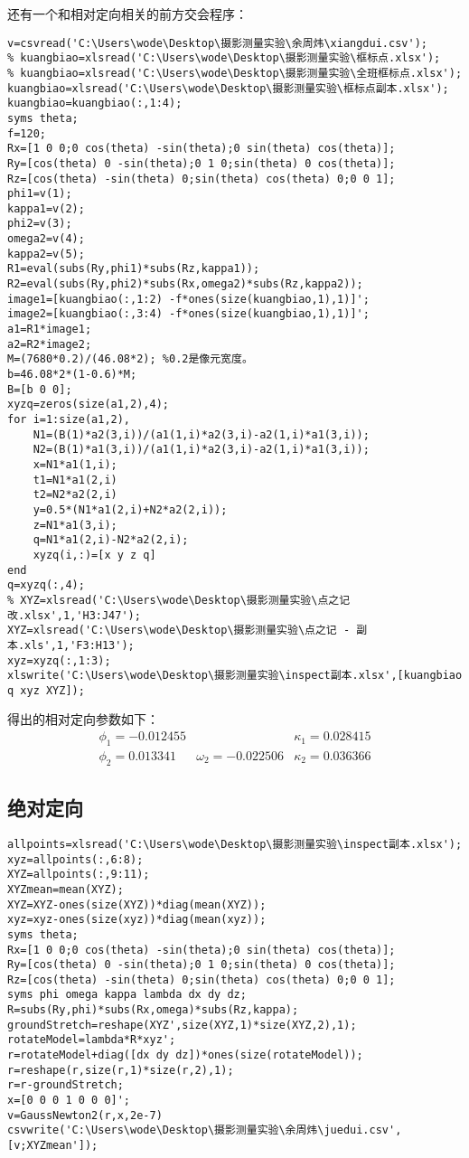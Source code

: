 还有一个和相对定向相关的前方交会程序：
\begin{lstlisting}[caption=qianfang.m]
v=csvread('C:\Users\wode\Desktop\摄影测量实验\余周炜\xiangdui.csv');
% kuangbiao=xlsread('C:\Users\wode\Desktop\摄影测量实验\框标点.xlsx');
% kuangbiao=xlsread('C:\Users\wode\Desktop\摄影测量实验\全班框标点.xlsx');
kuangbiao=xlsread('C:\Users\wode\Desktop\摄影测量实验\框标点副本.xlsx');
kuangbiao=kuangbiao(:,1:4);
syms theta;
f=120;
Rx=[1 0 0;0 cos(theta) -sin(theta);0 sin(theta) cos(theta)];
Ry=[cos(theta) 0 -sin(theta);0 1 0;sin(theta) 0 cos(theta)];
Rz=[cos(theta) -sin(theta) 0;sin(theta) cos(theta) 0;0 0 1];
phi1=v(1);
kappa1=v(2);
phi2=v(3);
omega2=v(4);
kappa2=v(5);
R1=eval(subs(Ry,phi1)*subs(Rz,kappa1));
R2=eval(subs(Ry,phi2)*subs(Rx,omega2)*subs(Rz,kappa2));
image1=[kuangbiao(:,1:2) -f*ones(size(kuangbiao,1),1)]';
image2=[kuangbiao(:,3:4) -f*ones(size(kuangbiao,1),1)]';
a1=R1*image1;
a2=R2*image2;
M=(7680*0.2)/(46.08*2); %0.2是像元宽度。
b=46.08*2*(1-0.6)*M;
B=[b 0 0];
xyzq=zeros(size(a1,2),4);
for i=1:size(a1,2),
    N1=(B(1)*a2(3,i))/(a1(1,i)*a2(3,i)-a2(1,i)*a1(3,i));
    N2=(B(1)*a1(3,i))/(a1(1,i)*a2(3,i)-a2(1,i)*a1(3,i));
    x=N1*a1(1,i);
    t1=N1*a1(2,i)
    t2=N2*a2(2,i)
    y=0.5*(N1*a1(2,i)+N2*a2(2,i));
    z=N1*a1(3,i);
    q=N1*a1(2,i)-N2*a2(2,i);
    xyzq(i,:)=[x y z q]
end
q=xyzq(:,4);
% XYZ=xlsread('C:\Users\wode\Desktop\摄影测量实验\点之记改.xlsx',1,'H3:J47');
XYZ=xlsread('C:\Users\wode\Desktop\摄影测量实验\点之记 - 副本.xls',1,'F3:H13');
xyz=xyzq(:,1:3);
xlswrite('C:\Users\wode\Desktop\摄影测量实验\inspect副本.xlsx',[kuangbiao q xyz XYZ]);
\end{lstlisting}

得出的相对定向参数如下：
\begin{equation}
\begin{array}{lll}
\phi_1=-0.012455 & & \kappa_1=0.028415 \\
\phi_2=0.013341 & \omega_2=-0.022506 & \kappa_2=0.036366
\end{array}
\end{equation}

\subsection{绝对定向}

\begin{lstlisting}[caption=juedui.m文件]
allpoints=xlsread('C:\Users\wode\Desktop\摄影测量实验\inspect副本.xlsx');
xyz=allpoints(:,6:8);
XYZ=allpoints(:,9:11);
XYZmean=mean(XYZ);
XYZ=XYZ-ones(size(XYZ))*diag(mean(XYZ));
xyz=xyz-ones(size(xyz))*diag(mean(xyz));
syms theta;
Rx=[1 0 0;0 cos(theta) -sin(theta);0 sin(theta) cos(theta)];
Ry=[cos(theta) 0 -sin(theta);0 1 0;sin(theta) 0 cos(theta)];
Rz=[cos(theta) -sin(theta) 0;sin(theta) cos(theta) 0;0 0 1];
syms phi omega kappa lambda dx dy dz;
R=subs(Ry,phi)*subs(Rx,omega)*subs(Rz,kappa);
groundStretch=reshape(XYZ',size(XYZ,1)*size(XYZ,2),1);
rotateModel=lambda*R*xyz';
r=rotateModel+diag([dx dy dz])*ones(size(rotateModel));
r=reshape(r,size(r,1)*size(r,2),1);
r=r-groundStretch;
x=[0 0 0 1 0 0 0]';
v=GaussNewton2(r,x,2e-7)
csvwrite('C:\Users\wode\Desktop\摄影测量实验\余周炜\juedui.csv',[v;XYZmean']);
\end{lstlisting}


